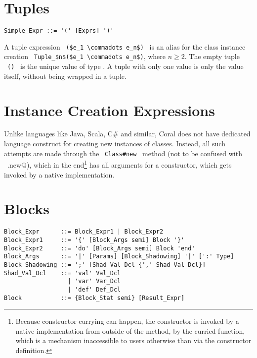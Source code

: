 \section{Tuples}
\label{sec:tuples}

\syntax\begin{lstlisting}
Simple_Expr ::= '(' [Exprs] ')'
\end{lstlisting}

A tuple expression ~\lstinline!($e_1 \commadots e_n$)!~ is an alias for the class instance creation ~\lstinline!Tuple_$n$($e_1 \commadots e_n$)!, where $n \geq 2$. The empty tuple ~\lstinline!()!~ is the unique value of type . A tuple with only one value is only the value itself, without being wrapped in a tuple. 






\section{Instance Creation Expressions}
\label{sec:instance-creation-exprs}

Unlike languages like Java, Scala, C\# and similar, Coral does not have dedicated language construct for creating new instances of classes. Instead, all such attempts are made through the ~\lstinline!Class#new!~ method (not to be confused with ~\lstinline@Class.new@), which in the end\footnote{Because constructor currying can happen, the constructor is invoked by a native implementation from outside of the  method, by the curried function, which is a mechanism inaccessible to users otherwise than via the constructor definition.} has all arguments for a constructor, which gets invoked by a native implementation. 






\section{Blocks}
\label{sec:blocks}

\syntax\begin{lstlisting}
Block_Expr      ::= Block_Expr1 | Block_Expr2
Block_Expr1     ::= '{' [Block_Args semi] Block '}'
Block_Expr2     ::= 'do' [Block_Args semi] Block 'end'
Block_Args      ::= '|' [Params] [Block_Shadowing] '|' [':' Type]
Block_Shadowing ::= ';' [Shad_Val_Dcl {',' Shad_Val_Dcl}]
Shad_Val_Dcl    ::= 'val' Val_Dcl
                  | 'var' Var_Dcl
                  | 'def' Def_Dcl
Block           ::= {Block_Stat semi} [Result_Expr]
\end{lstlisting}

